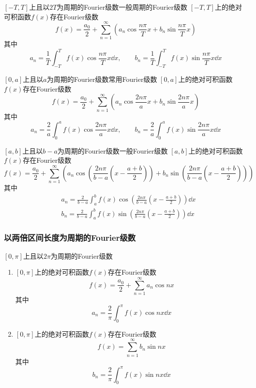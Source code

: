 \documentclass[lang = cn, scheme = chinese, thmcnt = section]{elegantbook}
\begin{document}
\begin{theorem}{$[-T,T]$上且以$2T$为周期的Fourier级数}{一般周期的Fourier级数}
	$[-T,T]$上的绝对可积函数$f(x)$存在Fourier级数%
	$$
	f(x)=\frac{a_0}{2}+\sum_{n=1}^{\infty}\left(a_n\cos \frac{n\pi}{T}x+b_n\sin \frac{n\pi}{T}x\right)
	$$
	其中%
	$$
	a_n=\frac{1}{T}\int_{-T}^{T}f(x)\cos \frac{n\pi}{T} x\dd x,\qquad 
	b_n=\frac{1}{T}\int_{-T}^{T}f(x)\sin \frac{n\pi}{T} x\dd x
	$$
\end{theorem}

\begin{theorem}{$[0,a]$上且以$a$为周期的Fourier级数}{常用Fourier级数}
	$[0,a]$上的绝对可积函数$f(x)$存在Fourier级数
	$$
	f(x)=\frac{a_0}{2}+\sum_{n=1}^{\infty}
	\left(
	a_n\cos\frac{2n\pi}{a}x
	+b_n\sin\frac{2n\pi}{a}x
	\right)
	$$
	其中%
	$$
	a_n=\frac{2}{a}\int_{0}^{a}f(x)\cos\frac{2n\pi}{a}x\dd x,\qquad
	b_n=\frac{2}{a}\int_{0}^{a}f(x)\sin\frac{2n\pi}{a}x\dd x
	$$
\end{theorem}

\begin{theorem}{$[a,b]$上且以$b-a$为周期的Fourier级数}{一般Fourier级数}
	$[a,b]$上的绝对可积函数$f(x)$存在Fourier级数%
	$$
	f(x)=\frac{a_0}{2}+\sum_{n=1}^{\infty}
	\left(
	a_n\cos \left(\frac{2n\pi}{b-a}\left(x-\frac{a+b}{2}\right)\right)
	+b_n\sin \left(\frac{2n\pi}{b-a}\left(x-\frac{a+b}{2}\right)\right)
	\right)
	$$
	其中
	\begin{align*}
		& a_n=\frac{2}{b-a}\int_{a}^{b}f(x)\cos \left(\frac{2n\pi}{b-a}\left(x-\frac{a+b}{2}\right)\right)\dd x\\
		& b_n=\frac{2}{b-a}\int_{a}^{b}f(x)\sin \left(\frac{2n\pi}{b-a}\left(x-\frac{a+b}{2}\right)\right)\dd x
	\end{align*}
\end{theorem}

\subsubsection{以两倍区间长度为周期的Fourier级数}

\begin{theorem}{$[0,\pi]$上且以$2\pi$为周期的Fourier级数}
	\begin{enumerate}
		\item $[0,\pi]$上的绝对可积函数$f(x)$存在Fourier级数
		$$
		f(x)=\frac{a_0}{2}+\sum_{n=1}^{\infty}a_n\cos nx
		$$
		其中%
		$$
		a_n=\frac{2}{\pi}\int_{0}^{\pi}f(x)\cos n x\dd x
		$$
		\item $[0,\pi]$上的绝对可积函数$f(x)$存在Fourier级数
		$$
		f(x)=\sum_{n=1}^{\infty}b_n\sin nx
		$$
		其中%
		$$
		b_n=\frac{2}{\pi}\int_{0}^{\pi}f(x)\sin n x\dd x
		$$
	\end{enumerate}
\end{theorem}
\end{document}

